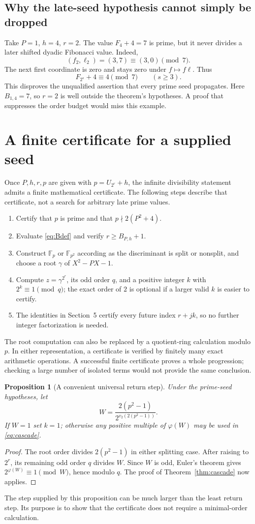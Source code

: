 \documentclass[11pt,a4paper]{article}
\newtheorem{proposition}[theorem]{Proposition}
\theoremstyle{definition}\newtheorem{definition}[theorem]{Definition}
\theoremstyle{remark}\newtheorem{remark}[theorem]{Remark}
\newcommand{\Fq}{\mathbb F}
\begin{document}
\subsection{Why the late-seed hypothesis cannot simply be dropped}
Take $P=1$, $h=4$, $r=2$. The value $F_4+4=7$ is prime, but it never
divides a later shifted dyadic Fibonacci value. Indeed,
\[
 (f_2,\ell_2)=(3,7)\equiv(3,0)\pmod7.
\]
The next first coordinate is zero and stays zero under
$f\mapsto f\ell$. Thus
\[
 F_{2^s}+4\equiv4\pmod7\qquad(s\ge3).
\]
This disproves the unqualified assertion that every prime seed
propagates. Here $B_{1,4}=7$, so $r=2$ is well outside the theorem's
hypotheses. A proof that suppresses the order budget would miss this
example.

\section{A finite certificate for a supplied seed}
Once $P,h,r,p$ are given with $p=U_{2^r}+h$, the infinite divisibility
statement admits a finite mathematical certificate. The following
steps describe that certificate, not a search for arbitrary late prime
values.
\begin{enumerate}
\item Certify that $p$ is prime and that $p\nmid2(P^2+4)$.
\item Evaluate \eqref{eq:Bdef} and verify $r\ge B_{P,h}+1$.
\item Construct $\Fq_p$ or $\Fq_{p^2}$ according as the discriminant
is split or nonsplit, and choose a root $\gamma$ of $X^2-PX-1$.
\item Compute $z=\gamma^{2^r}$, its odd order $q$, and a positive
integer $k$ with $2^k\equiv1\pmod q$; the exact order of $2$ is
optional if a larger valid $k$ is easier to certify.
\item The identities in Section~5 certify every future index
$r+jk$, so no further integer factorization is needed.
\end{enumerate}
The root computation can also be replaced by a quotient-ring
calculation modulo $p$. In either representation, a certificate is
verified by finitely many exact arithmetic operations. A successful
finite certificate proves a whole progression; checking a large number
of isolated terms would not provide the same conclusion.

\begin{proposition}[A convenient universal return step]
Under the prime-seed hypotheses, let
\[
 W=\frac{2(p^2-1)}{2^{v_2(2(p^2-1))}}.
\]
If $W=1$ set $k=1$; otherwise any positive multiple of
$\varphi(W)$ may be used in \eqref{eq:cascade}.
\end{proposition}
\begin{proof}
The root order divides $2(p^2-1)$ in either splitting case. After
raising to $2^r$, its remaining odd order $q$ divides $W$.
Since $W$ is odd, Euler's theorem gives
$2^{\varphi(W)}\equiv1\pmod W$, hence modulo $q$. The proof of
Theorem~\ref{thm:cascade} now applies.
\end{proof}
The step supplied by this proposition can be much larger than the
least return step. Its purpose is to show that the certificate does
not require a minimal-order calculation.
\end{document}
